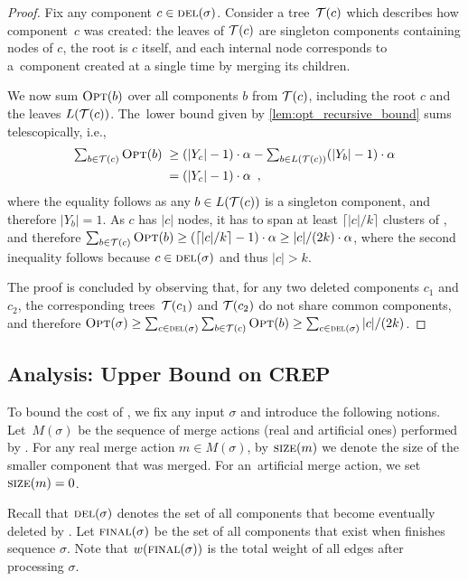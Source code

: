 \begin{proof}
Fix any component $c \in \textsc{del}(\sigma)$. Consider a tree~$\mathcal{T}(c)$ which
describes how component~$c$ was created: the leaves of $\mathcal{T}(c)$ are singleton
components containing nodes of $c$, the root is $c$ itself, and each internal
node corresponds to a~component created at a single time by merging its
children.

We now sum $\textsc{Opt}(b)$ over all components $b$ from $\mathcal{T}(c)$, including 
the root $c$ and the leaves $L(\mathcal{T}(c))$. The~lower bound given 
by \ref{lem:opt_recursive_bound} sums telescopically, i.e.,
\begin{align*}
	\textstyle \sum_{b \in \mathcal{T}(c)} \textsc{Opt}(b) \;
		\geq &\; \textstyle (|Y_c|-1) \cdot \alpha - \sum_{b \in L(\mathcal{T}(c))} (|Y_b|-1) \cdot \alpha \\
		= &\; \textstyle (|Y_c|-1) \cdot \alpha 
	\enspace,
\end{align*}
where the equality follows as any $b \in L(\mathcal{T}(c))$ is a singleton component,
and therefore $|Y_b| = 1$. As $c$ has $|c|$ nodes, it has to span at least
$\lceil |c|/k \rceil$ clusters of \OPT, and therefore $\sum_{b \in \mathcal{T}(c)}
\textsc{Opt}(b) \geq (\lceil |c|/k \rceil -1) \cdot \alpha \geq |c| / (2 k) \cdot
\alpha$, where the second inequality follows because $c \in \textsc{del}(\sigma)$ and
thus $|c| > k$.

The proof is concluded by observing that, for any two deleted components $c_1$
and $c_2$, the corresponding trees~$\mathcal{T}(c_1)$ and $\mathcal{T}(c_2)$ do not share common
components, and therefore $\textsc{Opt}(\sigma) \geq \sum_{c \in \textsc{del}(\sigma)} \sum_{b
\in \mathcal{T}(c)} \textsc{Opt}(b) \geq \sum_{c \in \textsc{del}(\sigma)} |c| / (2k)$.
\end{proof}


\subsection{Analysis: Upper Bound on CREP}

To bound the cost of \CREP, we fix any input $\sigma$ and introduce the following 
notions. Let~$M(\sigma)$ be the sequence of merge actions 
(real and artificial ones) performed by \CREP. 
For any real merge action $m \in M(\sigma)$, by
$\textsc{size}(m)$ we denote the size of the smaller component that was
merged. For an~artificial merge action, we set $\textsc{size}(m) = 0$.

Recall that $\textsc{del}(\sigma)$ denotes the 
set of all components that become eventually deleted by \CREP. Let $\textsc{final}(\sigma)$ 
be the set of all components that exist when \CREP finishes sequence $\sigma$.
Note that $w(\textsc{final}(\sigma))$ is the total weight of all edges after processing
$\sigma$. 

